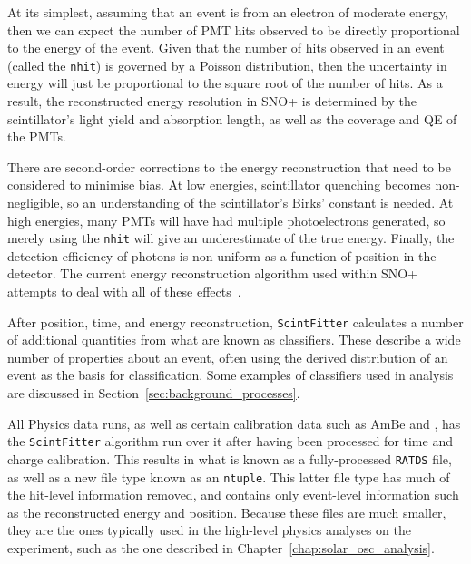 At its simplest, assuming that an event is from an electron of moderate energy, then we can expect the number of PMT hits observed to be directly proportional to the energy of the event. Given that the number of hits observed in an event (called the \texttt{nhit}) is governed by a Poisson distribution, then the uncertainty in energy will just be proportional to the square root of the number of hits. As a result, the reconstructed energy resolution in SNO+ is determined by the scintillator's light yield and absorption length, as well as the coverage and QE of the PMTs.

There are second-order corrections to the energy reconstruction that need to be considered to minimise bias. At low energies, scintillator quenching becomes non-negligible, so an understanding of the scintillator's Birks' constant is needed. At high energies, many PMTs will have had multiple photoelectrons generated, so merely using the \texttt{nhit} will give an underestimate of the true energy. Finally, the detection efficiency of photons is non-uniform as a function of position in the detector. The current energy reconstruction algorithm used within SNO+ attempts to deal with all of these effects~\cite{}. %

After position, time, and energy reconstruction, \texttt{ScintFitter} calculates a number of additional quantities from what are known as classifiers. These describe a wide number of properties about an event, often using the derived \tres{} distribution of an event as the basis for classification. Some examples of classifiers used in analysis are discussed in Section~\ref{sec:background_processes}.

All Physics data runs, as well as certain calibration data such as AmBe and , has the \texttt{ScintFitter} algorithm run over it after having been processed for time and charge calibration. This results in what is known as a fully-processed \texttt{RATDS} file, as well as a new file type known as an \texttt{ntuple}. This latter file type has much of the hit-level information removed, and contains only event-level information such as the reconstructed energy and position. Because these files are much smaller, they are the ones typically used in the high-level physics analyses on the experiment, such as the one described in Chapter~\ref{chap:solar_osc_analysis}.


